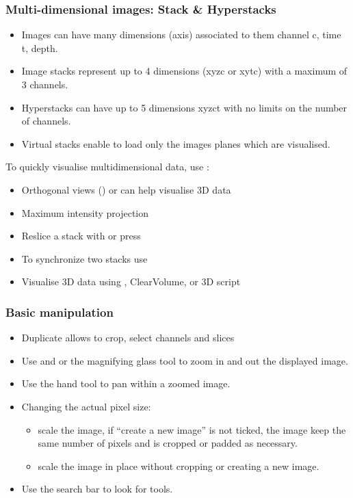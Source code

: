 \documentclass[ignorenonframetext,aspectratio=169,10pt,xcolor=table]{beamer}
\begin{document}
\begin{frame} \frametitle{Multi-dimensional images: Stack \& Hyperstacks}

  \begin{itemize} \setlength\itemsep{1em}
    \item Images can have many dimensions (axis) associated to them
      channel c, time t, depth.
    \item Image stacks represent up to 4 dimensions (xyzc or xytc) with
      a maximum of 3 channels.
    \item Hyperstacks can have up to 5 dimensions xyzct with no limits
      on the number of channels.
    \item Virtual stacks enable to load only the images planes which are
      visualised.
  \end{itemize}
  \vspace{1em}
  To quickly visualise multidimensional data, use :
  \vspace{0.5em}
  \begin{itemize}
      \vspace{1em}\item Orthogonal views () or
       can help visualise 3D data
    \item Maximum intensity projection 
    \item Reslice a stack with  or press \keys{/}
    \item To synchronize two stacks use 
    \item Visualise 3D data using , ClearVolume,  or 3D script
  \end{itemize}
\end{frame}


\begin{frame} \frametitle{Basic manipulation}

  \begin{itemize} \setlength\itemsep{1.5em}
    \item Duplicate  allows to crop, select
      channels and slices
    \item Use \keys{{+}} and \keys{-} or the magnifying glass tool to zoom
      in and out the displayed image.
    \item Use the hand tool to pan within a zoomed image.
    \item Changing the actual pixel size:
      \begin{itemize}
      \item {} scale the image, if ``create a new
        image'' is not ticked, the image keep the same number of pixels and is
        cropped or padded as necessary.
      \item {} scale the image in place
        without cropping or creating a new image.
      \end{itemize}
    \item Use the search bar to look for tools.
  \end{itemize}

\end{frame}
\end{document}
